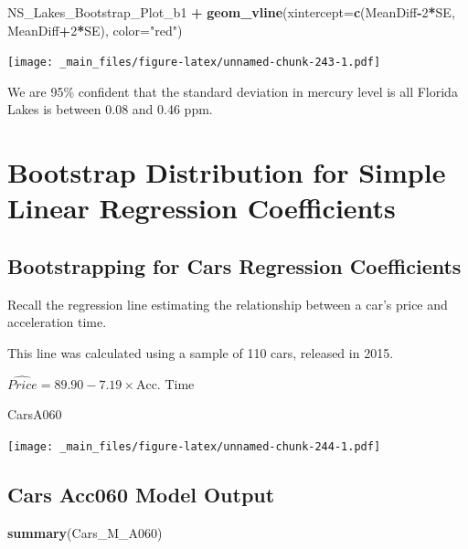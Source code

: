 \documentclass[]{book}
\newenvironment{Shaded}{\begin{snugshade}}{\end{snugshade}}
\newcommand{\KeywordTok}[1]{\textcolor[rgb]{0.13,0.29,0.53}{\textbf{#1}}}
\newcommand{\DataTypeTok}[1]{\textcolor[rgb]{0.13,0.29,0.53}{#1}}
\newcommand{\DecValTok}[1]{\textcolor[rgb]{0.00,0.00,0.81}{#1}}
\newcommand{\StringTok}[1]{\textcolor[rgb]{0.31,0.60,0.02}{#1}}
\newcommand{\OperatorTok}[1]{\textcolor[rgb]{0.81,0.36,0.00}{\textbf{#1}}}
\newcommand{\NormalTok}[1]{#1}
\begin{document}
\begin{Shaded}
\begin{Highlighting}[]
\NormalTok{NS_Lakes_Bootstrap_Plot_b1  }\OperatorTok{+}\StringTok{ }\KeywordTok{geom_vline}\NormalTok{(}\DataTypeTok{xintercept=}\KeywordTok{c}\NormalTok{(MeanDiff}\OperatorTok{-}\DecValTok{2}\OperatorTok{*}\NormalTok{SE, MeanDiff}\OperatorTok{+}\DecValTok{2}\OperatorTok{*}\NormalTok{SE), }\DataTypeTok{color=}\StringTok{"red"}\NormalTok{) }
\end{Highlighting}
\end{Shaded}

\texttt{[image: \_main\_files/figure-latex/unnamed-chunk-243-1.pdf]}

We are 95\% confident that the standard deviation in mercury level is
all Florida Lakes is between 0.08 and 0.46 ppm.

\section{Bootstrap Distribution for Simple Linear Regression
Coefficients}\label{bootstrap-distribution-for-simple-linear-regression-coefficients}

\subsection{Bootstrapping for Cars Regression
Coefficients}\label{bootstrapping-for-cars-regression-coefficients}

Recall the regression line estimating the relationship between a car's
price and acceleration time.

This line was calculated using a sample of 110 cars, released in 2015.

\(\widehat{Price} = 89.90 - 7.19\times\text{Acc. Time}\)

\begin{Shaded}
\begin{Highlighting}[]
\NormalTok{CarsA060}
\end{Highlighting}
\end{Shaded}

\texttt{[image: \_main\_files/figure-latex/unnamed-chunk-244-1.pdf]}

\subsection{Cars Acc060 Model Output}\label{cars-acc060-model-output}

\begin{Shaded}
\begin{Highlighting}[]
\KeywordTok{summary}\NormalTok{(Cars_M_A060)}
\end{Highlighting}
\end{Shaded}
\end{document}
